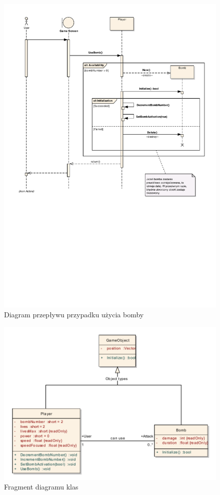 \documentclass[a4paper,twoside]{article}
\begin{document}
\begin{figure}[h!]
	\hspace{-25mm}
		\includegraphics[width=1.15\textwidth, trim={0 10cm 2cm 0}]{./images/Bomba.pdf}
	\caption{{\large Diagram przepływu przypadku użycia bomby}}
\end{figure}

\newpage

\begin{figure}[h!]
	\includegraphics[width=1.1\textwidth]{./images/Fragment.pdf}
	\caption{{\large Fragment diagramu klas}} 
\end{figure}
\end{document}
